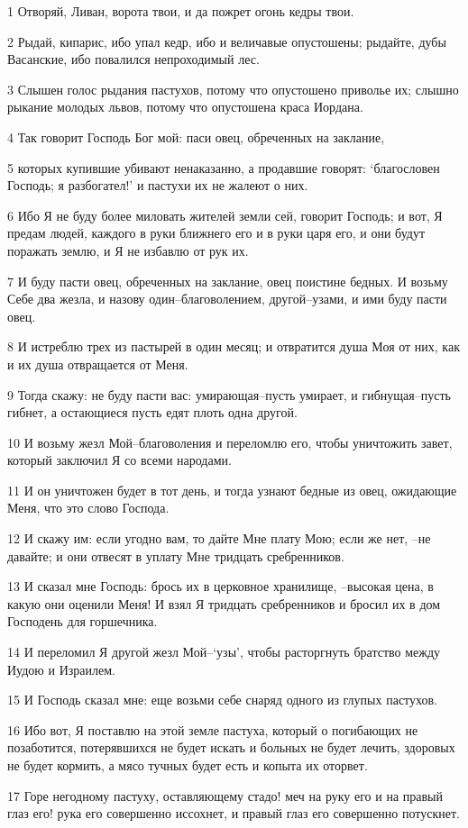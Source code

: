 \par 1 Отворяй, Ливан, ворота твои, и да пожрет огонь кедры твои.
\par 2 Рыдай, кипарис, ибо упал кедр, ибо и величавые опустошены; рыдайте, дубы Васанские, ибо повалился непроходимый лес.
\par 3 Слышен голос рыдания пастухов, потому что опустошено приволье их; слышно рыкание молодых львов, потому что опустошена краса Иордана.
\par 4 Так говорит Господь Бог мой: паси овец, обреченных на заклание,
\par 5 которых купившие убивают ненаказанно, а продавшие говорят: `благословен Господь; я разбогател!' и пастухи их не жалеют о них.
\par 6 Ибо Я не буду более миловать жителей земли сей, говорит Господь; и вот, Я предам людей, каждого в руки ближнего его и в руки царя его, и они будут поражать землю, и Я не избавлю от рук их.
\par 7 И буду пасти овец, обреченных на заклание, овец поистине бедных. И возьму Себе два жезла, и назову один--благоволением, другой--узами, и ими буду пасти овец.
\par 8 И истреблю трех из пастырей в один месяц; и отвратится душа Моя от них, как и их душа отвращается от Меня.
\par 9 Тогда скажу: не буду пасти вас: умирающая--пусть умирает, и гибнущая--пусть гибнет, а остающиеся пусть едят плоть одна другой.
\par 10 И возьму жезл Мой--благоволения и переломлю его, чтобы уничтожить завет, который заключил Я со всеми народами.
\par 11 И он уничтожен будет в тот день, и тогда узнают бедные из овец, ожидающие Меня, что это слово Господа.
\par 12 И скажу им: если угодно вам, то дайте Мне плату Мою; если же нет, --не давайте; и они отвесят в уплату Мне тридцать сребренников.
\par 13 И сказал мне Господь: брось их в церковное хранилище, --высокая цена, в какую они оценили Меня! И взял Я тридцать сребренников и бросил их в дом Господень для горшечника.
\par 14 И переломил Я другой жезл Мой--`узы', чтобы расторгнуть братство между Иудою и Израилем.
\par 15 И Господь сказал мне: еще возьми себе снаряд одного из глупых пастухов.
\par 16 Ибо вот, Я поставлю на этой земле пастуха, который о погибающих не позаботится, потерявшихся не будет искать и больных не будет лечить, здоровых не будет кормить, а мясо тучных будет есть и копыта их оторвет.
\par 17 Горе негодному пастуху, оставляющему стадо! меч на руку его и на правый глаз его! рука его совершенно иссохнет, и правый глаз его совершенно потускнет.

